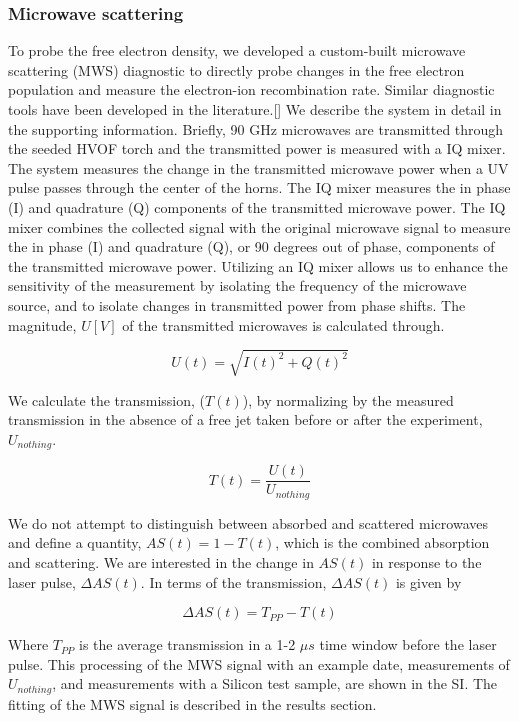 \subsubsection{Microwave scattering}

To probe the free electron density, we developed a custom-built microwave scattering (MWS) diagnostic to directly probe changes in the free electron population and measure the electron-ion recombination rate. Similar diagnostic tools have been developed in the literature.[]  We describe the system in detail in the supporting information. Briefly, 90 GHz microwaves are transmitted through the seeded HVOF torch and the transmitted power is measured with a IQ mixer. The system measures the change in the transmitted microwave power when a UV pulse passes through the center of the horns.  The IQ mixer measures the in phase (I) and quadrature (Q) components of the transmitted microwave power. The IQ mixer combines the collected signal with the original microwave signal to measure the in phase (I) and quadrature (Q), or 90 degrees out of phase, components of the transmitted microwave power. Utilizing an IQ mixer allows us to enhance the sensitivity of the measurement by isolating the frequency of the microwave source, and to isolate changes in transmitted power from phase shifts. The magnitude, $U [V]$ of the transmitted microwaves is calculated through.

\begin{equation}
    U(t) = \sqrt{I(t)^2 + Q(t)^2}
\end{equation}

We calculate the transmission, ($T(t)$), by normalizing by the measured transmission in the absence of a free jet taken before or after the experiment, $U_{nothing}$. 

\begin{equation}
    T(t) = \frac{U(t)}{U_{nothing}}
\end{equation}

We do not attempt to distinguish between absorbed and scattered microwaves and define a quantity, $AS(t) = 1- T(t)$, which is the combined absorption and scattering. We are interested in the change in $AS(t)$ in response to the laser pulse, $\Delta AS(t)$. In terms of the transmission, $\Delta AS(t)$ is given by

\begin{equation}
    \Delta AS(t) = T_{PP} - T(t)
\end{equation}

Where $T_{PP}$ is the average transmission in a 1-2 $\mu s$ time window before the laser pulse. This processing of the MWS signal with an example date, measurements of $U_{nothing}$, and measurements with a Silicon test sample, are shown in the SI. The fitting of the MWS signal is described in the results section. 

